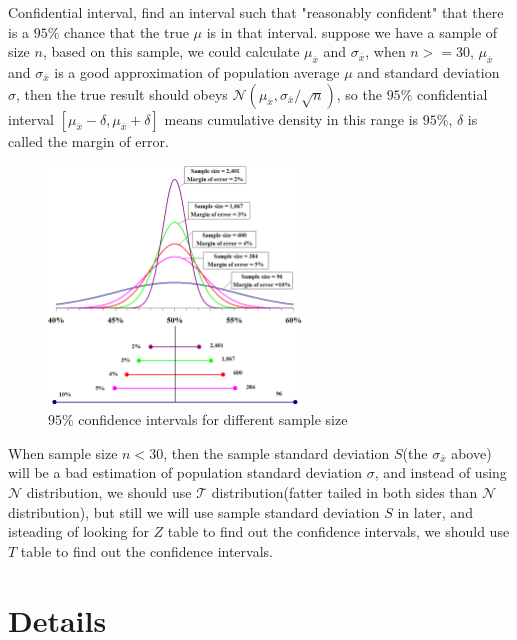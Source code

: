 \documentclass{llncs}
\begin{document}
Confidential interval, find an interval such that "reasonably confident" that there is a $95\%$ chance that the true $\mu$ is in that interval. suppose we have a sample of size $n$, based on this sample, we could calculate $\mu_{\overline{x}}$ and $\sigma_{\overline{x}}$, when $n>=30$, $\mu_{\overline{x}}$ and $\sigma_{\overline{x}}$ is a good approximation of population average $\mu$ and standard deviation $\sigma$, then the true result should obeys $\mathcal{N}(\mu_{\overline{x}},\sigma_{\overline{x}}/\sqrt{n})$, so the $95\%$ confidential interval $[\mu_{\overline{x}}-\delta,\mu_{\overline{x}}+\delta]$ means cumulative density in this range is $95\%$, $\delta$ is called the margin of error.

\begin{figure}
\centering
\includegraphics[width=0.6\textwidth]{Marginoferror.png}
\caption{$95\%$ confidence intervals for different sample size}
\end{figure}

When sample size $n<30$, then the sample standard deviation $S$(the $\sigma_{\overline{x}}$ above) will be a bad estimation of population standard deviation $\sigma$, and instead of using $\mathcal{N}$ distribution, we should use $\mathcal{T}$ distribution(fatter tailed in both sides than $\mathcal{N}$ distribution), but still we will use sample standard deviation $S$ in later, and isteading of looking for $Z$ table to find out the confidence intervals, we should use $T$ table to find out the confidence intervals.

\section{Details}
\end{document}
